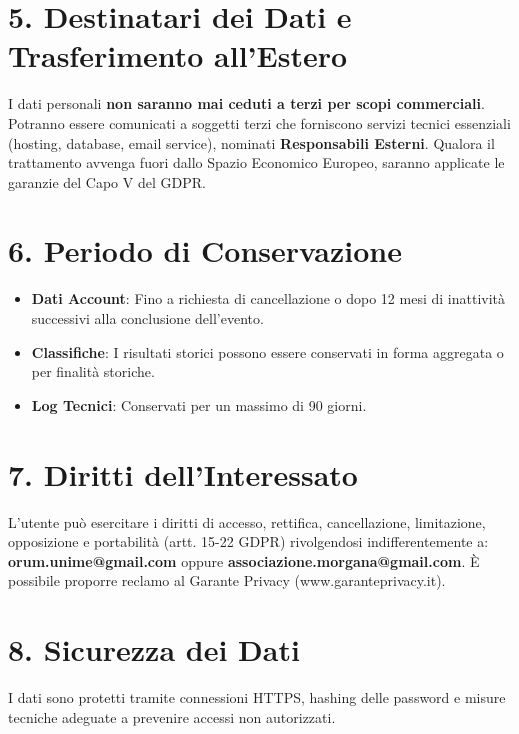 \documentclass[a4paper,11pt]{article}
\begin{document}
\section*{5. Destinatari dei Dati e Trasferimento all'Estero}

I dati personali \textbf{non saranno mai ceduti a terzi per scopi commerciali}. Potranno essere comunicati a soggetti terzi che forniscono servizi tecnici essenziali (hosting, database, email service), nominati \textbf{Responsabili Esterni}. Qualora il trattamento avvenga fuori dallo Spazio Economico Europeo, saranno applicate le garanzie del Capo V del GDPR.

\section*{6. Periodo di Conservazione}

\begin{itemize}[leftmargin=*]
    \item \textbf{Dati Account}: Fino a richiesta di cancellazione o dopo 12 mesi di inattività successivi alla conclusione dell'evento.
    \item \textbf{Classifiche}: I risultati storici possono essere conservati in forma aggregata o per finalità storiche.
    \item \textbf{Log Tecnici}: Conservati per un massimo di 90 giorni.
\end{itemize}

\section*{7. Diritti dell’Interessato}

L’utente può esercitare i diritti di accesso, rettifica, cancellazione, limitazione, opposizione e portabilità (artt. 15-22 GDPR) rivolgendosi indifferentemente a: \textbf{orum.unime@gmail.com} oppure \textbf{associazione.morgana@gmail.com}. È possibile proporre reclamo al Garante Privacy (www.garanteprivacy.it).

\section*{8. Sicurezza dei Dati}

I dati sono protetti tramite connessioni HTTPS, hashing delle password e misure tecniche adeguate a prevenire accessi non autorizzati.

\vspace{1cm}
\end{document}
